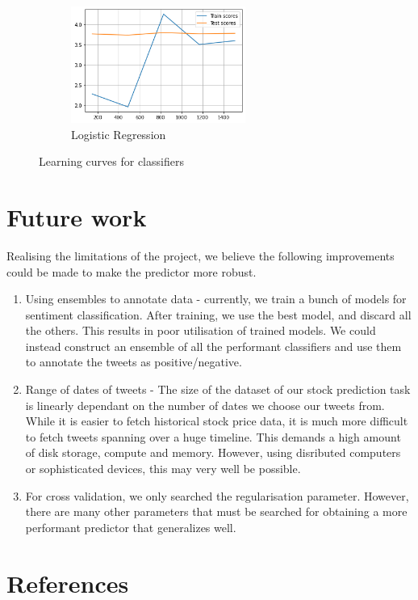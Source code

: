 \documentclass{article}
\begin{document}
\begin{figure}[htb!]
    \begin{subfigure}[t]{0.5\textwidth}
        \centering
        \includegraphics[height=1.5in]{img/delta-regression/learning-curves/lin-reg}
        \caption{Logistic Regression}
    \end{subfigure}

    \caption{Learning curves for classifiers}
\end{figure}

\clearpage

\pagebreak[4]
\section{Future work}
Realising the limitations of the project, we believe the following improvements could be made to make the predictor more robust.
\begin{enumerate}
    \item Using ensembles to annotate data - currently, we train a bunch of models for sentiment classification. After training, we use the best model, and discard all the others. This results in poor utilisation of trained models. We could instead construct an ensemble of all the performant classifiers and use them to annotate the tweets as positive/negative.
    \item Range of dates of tweets - The size of the dataset of our stock prediction task is linearly dependant on the number of dates we choose our tweets from. While it is easier to fetch historical stock price data, it is much more difficult to fetch tweets spanning over a huge timeline. This demands a high amount of disk storage, compute and memory. However, using disributed computers or sophisticated devices, this may very well be possible.
    \item For cross validation, we only searched the regularisation parameter. However, there are many other parameters that must be searched for obtaining a more performant predictor that generalizes well.
\end{enumerate}

\section{References}
\end{document}

